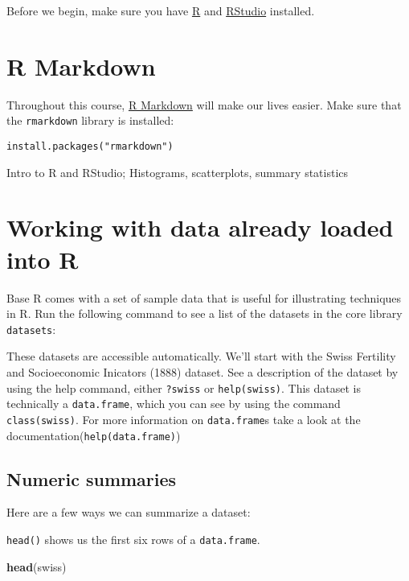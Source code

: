 \documentclass[]{book}
\newenvironment{Shaded}{\begin{snugshade}}{\end{snugshade}}
\newcommand{\KeywordTok}[1]{\textcolor[rgb]{0.13,0.29,0.53}{\textbf{{#1}}}}
\newcommand{\NormalTok}[1]{{#1}}
\begin{document}
Before we begin, make sure you have
\href{https://cran.r-project.org/}{R} and
\href{https://www.rstudio.com/products/rstudio/download3/\#download}{RStudio}
installed.

\section{R Markdown}\label{r-markdown}

Throughout this course,
\href{http://rmarkdown.rstudio.com/lesson-1.html}{R Markdown} will make
our lives easier. Make sure that the \texttt{rmarkdown} library is
installed:

\begin{verbatim}
install.packages("rmarkdown")
\end{verbatim}

Intro to R and RStudio; Histograms, scatterplots, summary statistics

\section{Working with data already loaded into
R}\label{working-with-data-already-loaded-into-r}

Base R comes with a set of sample data that is useful for illustrating
techniques in R. Run the following command to see a list of the datasets
in the core library \texttt{datasets}:

These datasets are accessible automatically. We'll start with the Swiss
Fertility and Socioeconomic Inicators (1888) dataset. See a description
of the dataset by using the help command, either \texttt{?swiss} or
\texttt{help(swiss)}. This dataset is technically a \texttt{data.frame},
which you can see by using the command \texttt{class(swiss)}. For more
information on \texttt{data.frame}s take a look at the
documentation(\texttt{help(data.frame)})

\subsection{Numeric summaries}\label{numeric-summaries}

Here are a few ways we can summarize a dataset:

\texttt{head()} shows us the first six rows of a \texttt{data.frame}.

\begin{Shaded}
\begin{Highlighting}[]
\KeywordTok{head}\NormalTok{(swiss)}
\end{Highlighting}
\end{Shaded}
\end{document}
